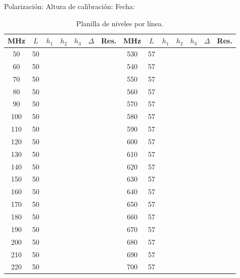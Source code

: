 \documentclass[11pt,a4paper]{article}
\begin{document}
\newpage
\begin{table}[H]
  \centering
  \footnotesize
  \caption{Planilla de niveles por línea.}
  \label{tab:planilla}
  Polarización: \underline{\hspace{2cm}} \qquad Altura de calibración: \underline{\hspace{2cm}} \qquad Fecha: \underline{\hspace{3cm}}

  \vspace{6pt}
  \renewcommand{\arraystretch}{1.05}
  \setlength{\tabcolsep}{3pt}
  \begin{tabular}{|c|c|p{0.75cm}|p{0.75cm}|p{0.75cm}|p{0.75cm}|p{0.95cm}||c|c|p{0.75cm}|p{0.75cm}|p{0.75cm}|p{0.75cm}|p{0.95cm}|}
    \hline
    MHz & $L$ & $h_1$ & $h_2$ & $h_3$ & $\Delta$ & Res. & MHz & $L$ & $h_1$ & $h_2$ & $h_3$ & $\Delta$ & Res. \\
    \hline
    50 & 50 &  &  &  &  &  & 530 & 57 &  &  &  &  &  \\
    60 & 50 &  &  &  &  &  & 540 & 57 &  &  &  &  &  \\
    70 & 50 &  &  &  &  &  & 550 & 57 &  &  &  &  &  \\
    80 & 50 &  &  &  &  &  & 560 & 57 &  &  &  &  &  \\
    90 & 50 &  &  &  &  &  & 570 & 57 &  &  &  &  &  \\
    100 & 50 &  &  &  &  &  & 580 & 57 &  &  &  &  &  \\
    110 & 50 &  &  &  &  &  & 590 & 57 &  &  &  &  &  \\
    120 & 50 &  &  &  &  &  & 600 & 57 &  &  &  &  &  \\
    130 & 50 &  &  &  &  &  & 610 & 57 &  &  &  &  &  \\
    140 & 50 &  &  &  &  &  & 620 & 57 &  &  &  &  &  \\
    150 & 50 &  &  &  &  &  & 630 & 57 &  &  &  &  &  \\
    160 & 50 &  &  &  &  &  & 640 & 57 &  &  &  &  &  \\
    170 & 50 &  &  &  &  &  & 650 & 57 &  &  &  &  &  \\
    180 & 50 &  &  &  &  &  & 660 & 57 &  &  &  &  &  \\
    190 & 50 &  &  &  &  &  & 670 & 57 &  &  &  &  &  \\
    200 & 50 &  &  &  &  &  & 680 & 57 &  &  &  &  &  \\
    210 & 50 &  &  &  &  &  & 690 & 57 &  &  &  &  &  \\
    220 & 50 &  &  &  &  &  & 700 & 57 &  &  &  &  &  \\

\end{tabular}
\end{table}
\end{document}
